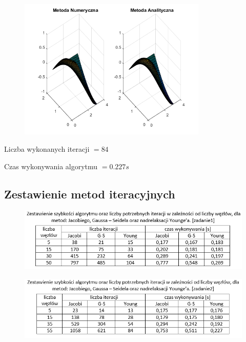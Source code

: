 \begin{figure}[!ht]
	\begin{center}
		\includegraphics[width=0.8\textwidth]{Lab6/charts/young/zad2/55.png}
	\end{center}
\end{figure}

Liczba wykonanych iteracji $ = 84 $

Czas wykonywania algorytmu $ = 0.227 s$

\newpage
\subsection{Zestawienie metod iteracyjnych}
\begin{figure}[!ht]
	\begin{center}
		\includegraphics[width=1\textwidth]{Lab6/charts/zestawienie_zad1.png}
	\end{center}
\end{figure}

\begin{figure}[!ht]
	\begin{center}
		\includegraphics[width=1\textwidth]{Lab6/charts/zestawienie_zad2.png}
	\end{center}
\end{figure}